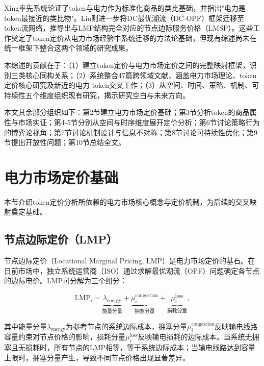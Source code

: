 \documentclass[11pt,twocolumn]{article}
\begin{document}
Xing\cite{xing2026tokenfutures}率先系统论证了token与电力作为标准化商品的类比基础，并指出"电力是token最接近的类比物"。Liu\cite{liu2026locational}则进一步将DC最优潮流（DC-OPF）框架迁移至token流网络，推导出与LMP结构完全对应的节点边际服务价格（LMSP）。这些工作奠定了token定价从电力市场经验中系统迁移的方法论基础，但现有综述尚未在统一框架下整合这两个领域的研究成果。

本综述的贡献在于：（1）建立token定价与电力市场定价之间的完整映射框架，识别三类核心同构关系；（2）系统整合47篇跨领域文献，涵盖电力市场理论、token定价核心研究及新近的电力-token交叉工作；（3）从空间、时间、策略、机制、可持续性五个维度组织现有研究，揭示研究空白与未来方向。

本文其余部分组织如下：第2节建立电力市场定价基础；第3节分析token的商品属性与市场实证；第4-5节分别从空间与时序维度展开定价分析；第6节讨论策略行为的博弈论视角；第7节讨论机制设计与信息不对称；第8节讨论可持续性优化；第9节提出开放性问题；第10节总结全文。

\section{电力市场定价基础}

本节介绍token定价分析所依赖的电力市场核心概念与定价机制，为后续的交叉映射奠定基础。

\subsection{节点边际定价（LMP）}

节点边际定价（Locational Marginal Pricing, LMP）是电力市场定价的基石\cite{schweppe1988spot,hogan1992contract}。在日前市场中，独立系统运营商（ISO）通过求解最优潮流（OPF）问题确定各节点的边际电价。LMP可分解为三个组分：

\begin{equation}
\text{LMP}_i = \underbrace{\lambda_{\text{energy}}}_{\text{能量分量}} + \underbrace{\mu_i^{\text{congestion}}}_{\text{拥塞分量}} + \underbrace{\mu_i^{\text{loss}}}_{\text{损耗分量}},
\label{eq:lmp}
\end{equation}

其中能量分量$\lambda_{\text{energy}}$为参考节点的系统边际成本，拥塞分量$\mu_i^{\text{congestion}}$反映输电线路容量约束对节点价格的影响，损耗分量$\mu_i^{\text{loss}}$反映输电损耗的边际成本\cite{stofft2002power}。当系统无拥塞且无损耗时，所有节点的LMP相等，等于系统边际成本；当输电线路达到容量上限时，拥塞分量产生，导致不同节点价格出现显著差异。
\end{document}
